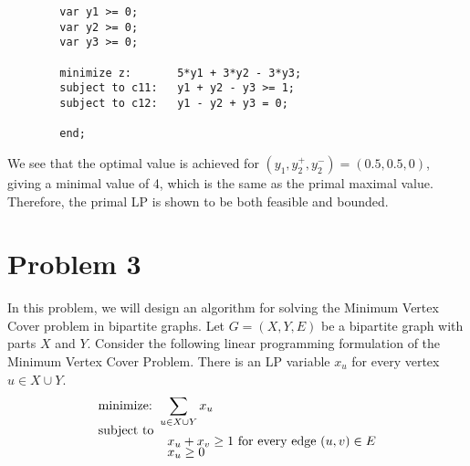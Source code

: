 \begin{solution}
\begin{enumerate}
        \begin{lstlisting}
        var y1 >= 0; 
        var y2 >= 0; 
        var y3 >= 0;
        
        minimize z:       5*y1 + 3*y2 - 3*y3;
        subject to c11:   y1 + y2 - y3 >= 1;
        subject to c12:   y1 - y2 + y3 = 0;
        
        end;   
        \end{lstlisting}

        We see that the optimal value is achieved for $(y_1, y_2^+, y_2^-) = (0.5, 0.5, 0)$, giving a minimal value of 4, which is the same as the primal maximal value. Therefore, the primal LP is shown to be both feasible and bounded.
    \end{enumerate}
    
\end{solution}
\newpage
\section{Problem 3}
In this problem, we will design an algorithm for solving the Minimum Vertex Cover problem in bipartite graphs. Let $G = (X, Y, E)$ be a bipartite graph with parts $X$ and $Y$. Consider the following linear programming formulation of the Minimum Vertex Cover Problem. There is an LP variable $x_u$ for every vertex $ u \in X \cup Y$.
\begin{align*}
    &\text{minimize: } \sum_{u \in X\cup Y} x_u\\[-1.5ex]
    &\text{subject to}\\[-1.5ex]
    &\hspace{19mm} x_u + x_v \geq 1 \text{ for every edge } (u, v) \in E\\[-1.5ex]
    &\hspace{19mm} x_u \geq 0
\end{align*}


